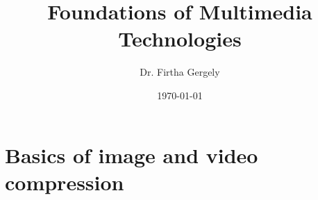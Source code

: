 \documentclass{book}
\title{Foundations of Multimedia Technologies}
\author{Dr. Firtha Gergely}
\date{\today}
\begin{document}
\sloppy 


\titlepage
\maketitle
\cleardoublepage 
  
\tableofcontents

\setcounter{page}{1}			%

%
% 

% 

\chapter{Basics of image and video compression}
\label{sec:compression}
 
\end{document}
